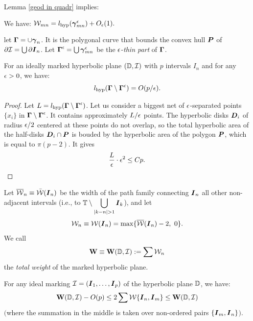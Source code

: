 Lemma \ref{geod in quadr}  implies: 

\begin{lem}\label{hyp d vs length}
   We have: ${\mathcal W}_{mn} = l_{\mathrm{hyp}}({\boldsymbol{\gamma}}_{mn}^{\epsilon} )   + O_{\epsilon} (1). $
\end{lem}


let ${\boldsymbol\Gamma}= \cup {\boldsymbol{\gamma}}_n$. 
It is  the polygonal curve that bounds  the convex hull ${\boldsymbol{P}}$  of $\partial {\mathcal I}= \bigcup \partial {\boldsymbol{I}}_n$.  
Let $ {\boldsymbol\Gamma}^{\epsilon} = \bigcup {\boldsymbol{\gamma}}^{\epsilon}_{mn}$ be the ${\epsilon}$-{\it thin part} of ${\boldsymbol\Gamma}$. 

\begin{prop}\label{thick part estimate}
 For an ideally  marked hyperbolic plane $({\Bbb D}, {\mathcal I})$ with $p$
 intervals $I_n$ and for any ${\epsilon}>0$, we have:
$$
       l_{\mathrm{hyp}} ({\boldsymbol\Gamma} \setminus {\boldsymbol\Gamma}^{\epsilon}) = O(p/{\epsilon}).
$$
\end{prop}

\begin{proof}
  Let $L= l_{\mathrm{hyp}} ({\boldsymbol\Gamma} \setminus {\boldsymbol\Gamma}^{\epsilon}) $.
  Let us consider a biggest net of ${\epsilon}$-separated points $\{ x_i\}$ in ${\boldsymbol\Gamma}\setminus
  {\boldsymbol\Gamma}^{\epsilon}$. It contains approximately  $ L/{\epsilon}$ points. The
  hyperbolic  disks ${\boldsymbol{D}}_i$  of
  radius ${\epsilon}/2$ centered at these points do not overlap, so the total
  hyperbolic area of the half-disks ${\boldsymbol{D}}_i \cap {\boldsymbol{P}}$  is bouded by the hyperbolic area of the polygon
  ${\boldsymbol{P}} $, which is equal to  $\pi (p-2)$. It gives
$$
        \frac L{{\epsilon}} \cdot {\epsilon}^2  \leq C  p.
$$
\end{proof}



Let $\overline  {{\mathcal W}}_n \equiv \bar {{\mathcal W}}({\boldsymbol{I}}_n)$ be the width of the path family connecting ${\boldsymbol{I}}_n$ 
all other non-adjacent intervals (i.e., to  $\displaystyle{ {\Bbb T}\setminus\bigcup_{|k-n| >1} {\boldsymbol{I}}_k } $),
and let 
$$
           {\mathcal W}_n\equiv    {\mathcal W}({\boldsymbol{I}}_n) =   \max  \{ \overline {{\mathcal W}}({\boldsymbol{I}}_n)  -2, \ 0 \} .
$$ 
We call
$$
      {\mathbf{W}} \equiv {\mathbf{W}}({\Bbb D}, {\mathcal I} ) :  = \sum {\mathcal W}_n 
$$
the {\it total weight} of the marked hyperbolic plane. 

\begin{thm}\label{main estimate} 
For any ideal marking ${\mathcal I} = ({\boldsymbol{I}}_1, \dots, {\boldsymbol{I}}_p)$ of the hyperbolic plane
${\Bbb D}$,  we have:
$$
         {\mathbf{W}} ({\Bbb D}, {\mathcal I})   - O(p)    \leq   2 \sum {\mathcal W}\{{\boldsymbol{I}}_n, {\boldsymbol{I}}_m\}  
     \leq    {\mathbf{W}}({\Bbb D}, {\mathcal I} ) 
$$
$($where the summation in the middle is taken over non-ordered pairs
$\{ {\boldsymbol{I}}_m, {\boldsymbol{I}}_n\}$$)$. 
\end{thm} 

